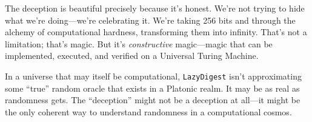 \documentclass[11pt]{article}
\begin{document}
The deception is beautiful precisely because it's honest. We're not trying to hide what we're doing---we're celebrating it. We're taking 256 bits and through the alchemy of computational hardness, transforming them into infinity. That's not a limitation; that's magic. But it's \emph{constructive} magic---magic that can be implemented, executed, and verified on a Universal Turing Machine.

In a universe that may itself be computational, \texttt{LazyDigest} isn't approximating some ``true'' random oracle that exists in a Platonic realm. It may be as real as randomness gets. The ``deception'' might not be a deception at all---it might be the only coherent way to understand randomness in a computational cosmos.



\end{document}
